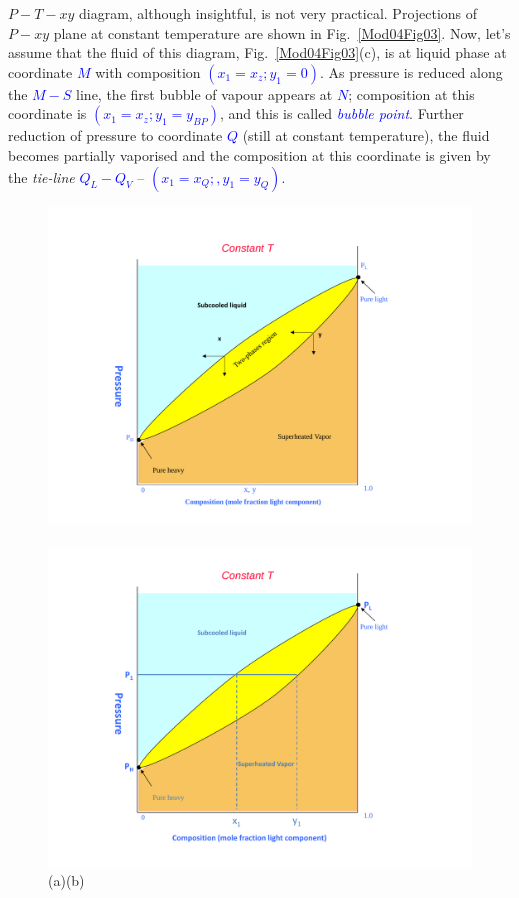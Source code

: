 \documentclass[12pts,a4paper,amsmath,amssymb,floatfix]{article}%
\newcommand{\blue}{\textcolor{blue}}
\begin{document}
$P-T-xy$ diagram, although insightful, is not very practical. Projections of $P-xy$ plane at constant temperature are shown in Fig.~\ref{Mod04Fig03}. Now, let's assume that the fluid of this diagram, Fig.~\ref{Mod04Fig03}(c), is at liquid phase at coordinate \blue{$M$} with composition \blue{$\left(x_{1}=x_{z};y_{1}=0\right)$}. As pressure is reduced along the \blue{$M-S$} line, the first bubble of vapour appears at \blue{$N$}; composition at this coordinate is \blue{$\left(x_{1}=x_{z};y_{1}=y_{BP}\right)$}, and this is called \blue{\it bubble point}. Further reduction of pressure to coordinate \blue{$Q$} (still at constant temperature), the fluid becomes partially vaporised and the composition at this coordinate is given by the {\it tie-line} \blue{$Q_{L}-Q_{V}$} -- \blue{$\left(x_{1}=x_{Q};,y_{1}=y_{Q}\right)$}. 
      \begin{figure}[h]
        \vbox{\hbox{\hspace{-1.cm}\includegraphics[width=.7\linewidth,clip]{./../Pics/VLE_Pxy_Diagram1}
            \hspace{-4.cm}\includegraphics[width=.7\linewidth,clip]{./../Pics/VLE_Pxy_Diagram2}}
          \vspace{-.5cm}
          \hbox{\hspace{4.5cm}(a)\hspace{7cm}(b)}
}
\end{figure}
\end{document}
